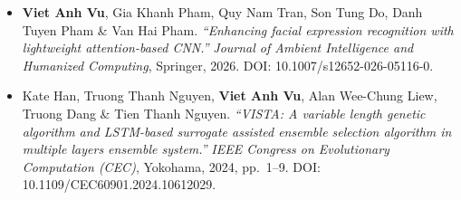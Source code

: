 \begin{itemize}
  \item \textbf{Viet Anh Vu}, Gia Khanh Pham, Quy Nam Tran, Son Tung Do, Danh Tuyen Pham \& Van Hai Pham. \textit{``Enhancing facial expression recognition with lightweight attention-based CNN.''} \emph{Journal of Ambient Intelligence and Humanized Computing}, Springer, 2026. DOI: 10.1007/s12652-026-05116-0.
  \item Kate Han, Truong Thanh Nguyen, \textbf{Viet Anh Vu}, Alan Wee-Chung Liew, Truong Dang \& Tien Thanh Nguyen. \textit{``VISTA: A variable length genetic algorithm and LSTM-based surrogate assisted ensemble selection algorithm in multiple layers ensemble system.''} \emph{IEEE Congress on Evolutionary Computation (CEC)}, Yokohama, 2024, pp.\ 1--9. DOI: 10.1109/CEC60901.2024.10612029.
\end{itemize}
\vspace{6pt}
